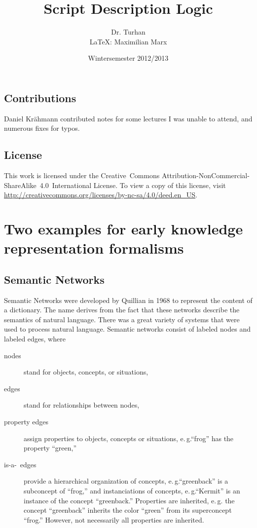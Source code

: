 \documentclass[openany]{scrbook}
\title{Script Description Logic}
\author{Dr. Turhan \\
  \LaTeX: Maximilian Marx}
\date{Wintersemester 2012/2013}
\theoremstyle{break}
\theoremstyle{nonumberbreak}
\theoremstyle{nonumberplain}
\theoremstyle{nonumberbreak}
\newcommand{\eg}{e{.}\,g{.}\xspace}
\begin{document}
\frontmatter

\maketitle


\tableofcontents

\section*{Contributions}
Daniel Krähmann contributed notes for some lectures I was unable to
attend, and numerous fixes for typos.

\section*{License}
\begin{minipage}{0.975\linewidth}
  This work is licensed under the Creative~Commons
  Attribution-NonCommercial-ShareAlike~4.0~International License. To
  view a copy of this license, visit
  \url{http://creativecommons.org/licenses/by-nc-sa/4.0/deed.en_US}.
\end{minipage}

\mainmatter

\chapter{Two examples for early knowledge representation formalisms}
\section{Semantic Networks}
Semantic Networks were developed by Quillian in 1968 to represent the
content of a dictionary. The name derives from the fact that these
networks describe the semantics of natural language. There was a great
variety of systems that were used to process natural language.
Semantic networks consist of labeled nodes and labeled edges, where
\begin{description}
\item[nodes] stand for objects, concepts, or situations,
\item[edges] stand for relationships between nodes,
\item[property edges] assign properties to objects, concepts or
  situations, \eg ``frog'' has the property ``green,''
\item[is-a-\ edges] provide a hierarchical organization of concepts,
  \eg ``greenback'' is a subconcept of ``frog,'' and instanciations of
  concepts, \eg ``Kermit'' is an instance of the concept
  ``greenback.'' Properties are inherited, \eg the concept
  ``greenback'' inherits the color ``green'' from its superconcept
  ``frog.'' However, not necessarily all properties are inherited.
\end{description}
\end{document}
